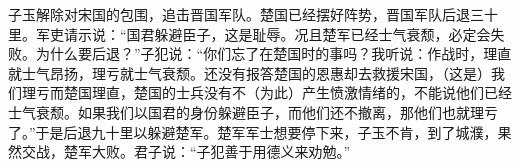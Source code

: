 \documentclass[11pt,a4paper]{ctexart}
\begin{document}
\begin{translation}
子玉解除对宋国的包围，追击晋国军队。楚国已经摆好阵势，晋国军队后退三十里。军吏请示说：“国君躲避臣子，这是耻辱。况且楚军已经士气衰颓，必定会失败。为什么要后退？”子犯说：“你们忘了在楚国时的事吗？我听说：作战时，理直就士气昂扬，理亏就士气衰颓。还没有报答楚国的恩惠却去救援宋国，（这是）我们理亏而楚国理直，楚国的士兵没有不（为此）产生愤激情绪的，不能说他们已经士气衰颓。如果我们以国君的身份躲避臣子，而他们还不撤离，那他们也就理亏了。”于是后退九十里以躲避楚军。楚军军士想要停下来，子玉不肯，到了城濮，果然交战，楚军大败。君子说：“子犯善于用德义来劝勉。”
\end{translation}
\end{document}
